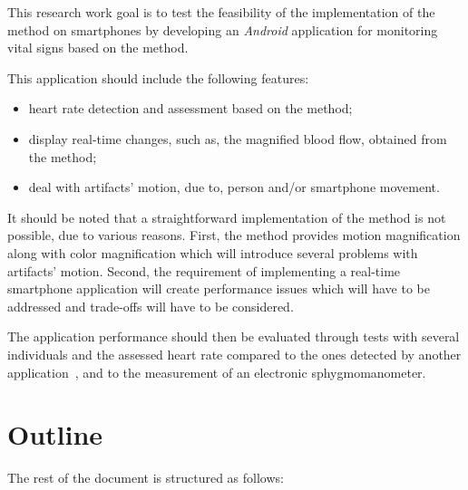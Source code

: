 
This research work goal is to test the feasibility of the
implementation of the \evm{} method on smartphones by developing
an \emph{Android} application for monitoring vital signs based on
the \evm{} method.

This application should include the following features:

\begin{itemize}
  \item heart rate detection and assessment based on the \evm{}
        method;
  \item display real-time changes, such as, the magnified blood
        flow, obtained from the \evm{} method;
  \item deal with artifacts' motion, due to, person and/or
        smartphone movement.
\end{itemize}

It should be noted that a straightforward implementation of the \evm{}
method is not possible, due to various reasons. First, the \evm{} method
provides motion magnification along with color magnification which will
introduce several problems with artifacts' motion. Second, the requirement
of implementing a real-time smartphone application will create performance
issues which will have to be addressed and trade-offs will have to be
considered.

The application performance should then be evaluated through tests
with several individuals and the assessed heart rate compared to
the ones detected by another application~\cite{Vitrox2013, Philips2013},
and to the measurement of an electronic sphygmomanometer.

\pagebreak

\section{Outline} \label{sec:intro:outline}

The rest of the document is structured as follows:

